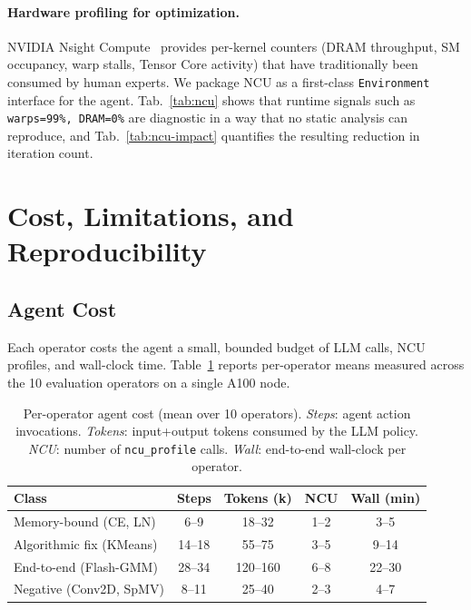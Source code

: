 \documentclass[sigconf,nonacm]{acmart}
\begin{document}
\paragraph{Hardware profiling for optimization.}
NVIDIA Nsight Compute~\cite{nvidia2024ncu} provides per-kernel
counters (DRAM throughput, SM occupancy, warp stalls, Tensor Core
activity) that have traditionally been consumed by human experts. We
package NCU as a first-class \texttt{Environment} interface for the
agent. Tab.~\ref{tab:ncu} shows that runtime signals such as
\texttt{warps=99\%, DRAM=0\%} are diagnostic in a way that no static
analysis can reproduce, and Tab.~\ref{tab:ncu-impact} quantifies the
resulting reduction in iteration count.

\section{Cost, Limitations, and Reproducibility}
\label{sec:limits}

\subsection{Agent Cost}

Each operator costs the agent a small, bounded budget of LLM
calls, NCU profiles, and wall-clock time. Table~\ref{tab:cost}
reports per-operator means measured across the 10 evaluation
operators on a single A100 node.

\begin{table}[h]
\centering
\caption{Per-operator agent cost (mean over 10 operators).
\emph{Steps}: agent action invocations.
\emph{Tokens}: input+output tokens consumed by the LLM policy.
\emph{NCU}: number of \texttt{ncu\_profile} calls.
\emph{Wall}: end-to-end wall-clock per operator.}
\label{tab:cost}
\setlength{\tabcolsep}{4pt}
\small
\begin{tabular}{lcccc}
\toprule
Class                 & Steps & Tokens (k) & NCU & Wall (min) \\
\midrule
Memory-bound (CE, LN) & 6--9   & 18--32 & 1--2 & 3--5 \\
Algorithmic fix (KMeans) & 14--18 & 55--75 & 3--5 & 9--14 \\
End-to-end (Flash-GMM) & 28--34 & 120--160 & 6--8 & 22--30 \\
Negative (Conv2D, SpMV) & 8--11 & 25--40 & 2--3 & 4--7 \\
\bottomrule
\end{tabular}
\end{table}
\end{document}

